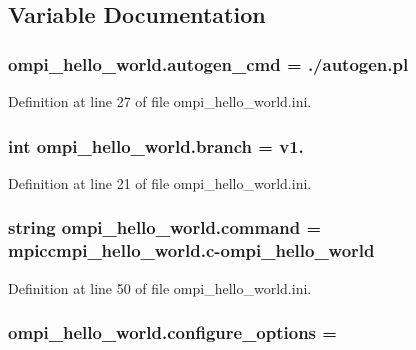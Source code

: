 \subsection{Variable Documentation}
\hypertarget{namespaceompi__hello__world_ab26bf3479d404017c9d0623f42e9dcd3}{
\subsubsection[{autogen\-\_\-cmd}]{\setlength{\rightskip}{0pt plus 5cm}ompi\-\_\-hello\-\_\-world.\-autogen\-\_\-cmd = ./autogen.\-pl}}\label{namespaceompi__hello__world_ab26bf3479d404017c9d0623f42e9dcd3}


Definition at line 27 of file ompi\-\_\-hello\-\_\-world.\-ini.

\hypertarget{namespaceompi__hello__world_a34c1b9feb533b831fb7b0cd036494718}{
\subsubsection[{branch}]{\setlength{\rightskip}{0pt plus 5cm}int ompi\-\_\-hello\-\_\-world.\-branch = v1.}}\label{namespaceompi__hello__world_a34c1b9feb533b831fb7b0cd036494718}


Definition at line 21 of file ompi\-\_\-hello\-\_\-world.\-ini.

\hypertarget{namespaceompi__hello__world_aa34adcfe660e349e3d2d9f69eb9412bb}{
\subsubsection[{command}]{\setlength{\rightskip}{0pt plus 5cm}string ompi\-\_\-hello\-\_\-world.\-command = mpiccmpi\-\_\-hello\-\_\-world.\-c-\/ompi\-\_\-hello\-\_\-world}}\label{namespaceompi__hello__world_aa34adcfe660e349e3d2d9f69eb9412bb}


Definition at line 50 of file ompi\-\_\-hello\-\_\-world.\-ini.

\hypertarget{namespaceompi__hello__world_a7b6bd890daea8a06c3daea5019b415f1}{
\subsubsection[{configure\-\_\-options}]{\setlength{\rightskip}{0pt plus 5cm}ompi\-\_\-hello\-\_\-world.\-configure\-\_\-options =}}\label{namespaceompi__hello__world_a7b6bd890daea8a06c3daea5019b415f1}


